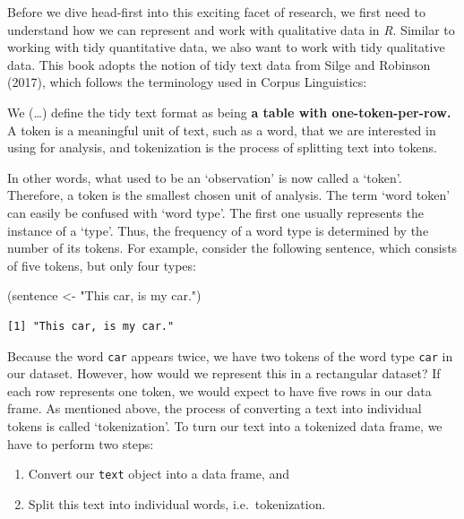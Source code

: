 \documentclass[
  letterpaper,
]{krantz}
\makeatletter
\newenvironment{Shaded}{\begin{snugshade}}{\end{snugshade}}
\newcommand{\NormalTok}[1]{\textcolor[rgb]{0.00,0.23,0.31}{#1}}
\newcommand{\OtherTok}[1]{\textcolor[rgb]{0.00,0.23,0.31}{#1}}
\newcommand{\StringTok}[1]{\textcolor[rgb]{0.13,0.47,0.30}{#1}}
\providecommand{\tightlist}{%
  \setlength{\itemsep}{0pt}\setlength{\parskip}{0pt}}\usepackage{longtable,booktabs,array}
\renewenvironment{quote}{\begin{VF}}{\end{VF}}
\newenvironment{kframe}{%
\medskip{}
\setlength{\fboxsep}{.8em}
 \def\at@end@of@kframe{}%
 \ifinner\ifhmode%
  \def\at@end@of@kframe{\end{minipage}}%
  \begin{minipage}{\columnwidth}%
 \fi\fi%
 \def\FrameCommand##1{\hskip\@totalleftmargin \hskip-\fboxsep
 \colorbox{shadecolor}{##1}\hskip-\fboxsep
     \hskip-\linewidth \hskip-\@totalleftmargin \hskip\columnwidth}%
 \MakeFramed {\advance\hsize-\width
   \@totalleftmargin\z@ \linewidth\hsize
   \@setminipage}}%
 {\par\unskip\endMakeFramed%
 \at@end@of@kframe}
\renewenvironment{Shaded}{\begin{kframe}}{\end{kframe}}
\makeatother
\begin{document}
Before we dive head-first into this exciting facet of research, we first
need to understand how we can represent and work with qualitative data
in \emph{R}. Similar to working with tidy quantitative data, we also
want to work with tidy qualitative data. This book adopts the notion of
tidy text data from Silge and Robinson (2017), which follows the
terminology used in Corpus Linguistics:

\begin{quote}
We (\ldots) define the tidy text format as being \textbf{a table with
one-token-per-row.} A token is a meaningful unit of text, such as a
word, that we are interested in using for analysis, and tokenization is
the process of splitting text into tokens.
\end{quote}

In other words, what used to be an `observation' is now called a
`token'. Therefore, a token is the smallest chosen unit of analysis. The
term `word token' can easily be confused with `word type'. The first one
usually represents the instance of a `type'. Thus, the frequency of a
word type is determined by the number of its tokens. For example,
consider the following sentence, which consists of five tokens, but only
four types:

\begin{Shaded}
\begin{Highlighting}[]
\NormalTok{(sentence }\OtherTok{\textless{}{-}} \StringTok{"This car, is my car."}\NormalTok{)}
\end{Highlighting}
\end{Shaded}

\begin{verbatim}
[1] "This car, is my car."
\end{verbatim}

Because the word \texttt{car} appears twice, we have two tokens of the
word type \texttt{car} in our dataset. However, how would we represent
this in a rectangular dataset? If each row represents one token, we
would expect to have five rows in our data frame. As mentioned above,
the process of converting a text into individual tokens is called
`tokenization'. To turn our text into a tokenized data frame, we have to
perform two steps:

\begin{enumerate}
\def\labelenumi{\arabic{enumi}.}
\tightlist
\item
  Convert our \texttt{text} object into a data frame, and
\item
  Split this text into individual words, i.e.~tokenization.
\end{enumerate}
\end{document}
